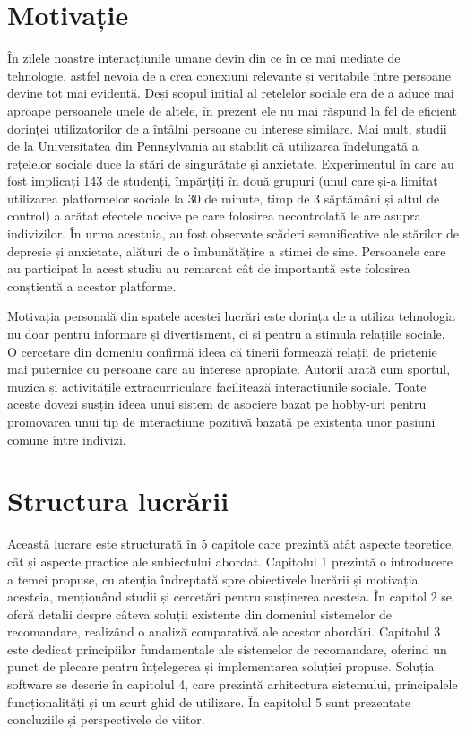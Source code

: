 \section{Motivație}
\label{section:ch1sec2}
În zilele noastre interacțiunile umane devin din ce în ce mai mediate de tehnologie, astfel nevoia de a crea conexiuni relevante și veritabile între persoane devine tot mai evidentă.
Deși scopul inițial al rețelelor sociale era de a aduce mai aproape persoanele unele de altele, în prezent ele nu mai răspund la fel de eficient dorinței utilizatorilor de a întâlni persoane cu interese similare.
Mai mult, studii de la Universitatea din Pennsylvania \cite{hunt2018no} au stabilit că utilizarea îndelungată a rețelelor sociale duce la stări de singurătate și anxietate.
Experimentul în care au fost implicați 143 de studenți, împărțiți în două grupuri (unul care și-a limitat utilizarea platformelor sociale la 30 de minute, timp de 3 săptămâni și altul de control) a arătat efectele nocive pe care folosirea necontrolată le are asupra indivizilor.
În urma acestuia, au fost observate scăderi semnificative ale stărilor de depresie și anxietate, alături de o îmbunătățire a stimei de sine.
Persoanele care au participat la acest studiu au remarcat cât de importantă este folosirea conștientă a acestor platforme.
\par
Motivația personală din spatele acestei lucrări este dorința de a utiliza tehnologia nu doar pentru informare și divertisment, ci și pentru a stimula relațiile sociale.
O cercetare din domeniu \cite{xiao2018common} confirmă ideea că tinerii formează relații de prietenie mai puternice cu persoane care au interese apropiate.
Autorii arată cum sportul, muzica și activitățile extracurriculare facilitează interacțiunile sociale.
Toate aceste dovezi susțin ideea unui sistem de asociere bazat pe hobby-uri pentru promovarea unui tip de interacțiune pozitivă bazată pe existența unor pasiuni comune între indivizi.

\section{Structura lucrării}
\label{section:ch1sec3}

Această lucrare este structurată în 5 capitole care prezintă atât aspecte teoretice, cât și aspecte practice ale subiectului abordat. 
Capitolul 1 prezintă o introducere a temei propuse, cu atenția îndreptată spre obiectivele lucrării și motivația acesteia, menționând studii și cercetări pentru susținerea acesteia.
În capitol 2 se oferă detalii despre câteva soluții existente din domeniul sistemelor de recomandare, realizând o analiză comparativă ale acestor abordări.
Capitolul 3 este dedicat principiilor fundamentale ale sistemelor de recomandare, oferind un punct de plecare pentru înțelegerea și implementarea soluției propuse.
Soluția software se descrie în capitolul 4, care prezintă arhitectura sistemului, principalele funcționalități și un scurt ghid de utilizare.
În capitolul 5 sunt prezentate concluziile și perspectivele de viitor.

